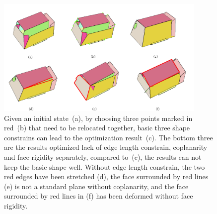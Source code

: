 \begin{figure}
	\centering
	\includegraphics[width=0.9\textwidth]{images/constrain.jpg}
	\caption{Given an initial state~(a), by choosing three points marked in red~(b) that need to be relocated together, basic three shape constrains can lead to the optimization result~(c). The bottom three are the results optimized lack of edge length constrain, coplanarity and face rigidity separately, compared to~(c), the results can not keep the basic shape well. Without edge length constrain, the two red edges have been stretched (d), the face surrounded by red lines (e) is not a standard plane without coplanarity, and the face surrounded by red lines in (f) has been deformed without face rigidity.}
	\label{fig:constrain}
\end{figure}

